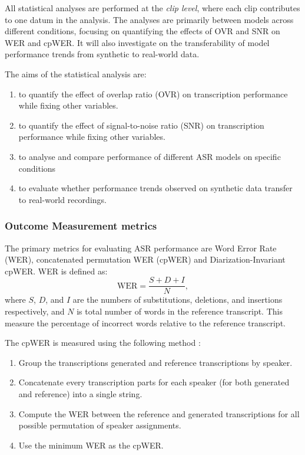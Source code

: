 
All statistical analyses are performed at the \textit{clip level}, where each clip contributes to one datum in the analysis. The analyses are primarily between models across different conditions, focusing on quantifying the effects of OVR and SNR on WER and cpWER. It will also investigate on the transferability of model performance trends from synthetic to real-world data.

The aims of the statistical analysis are:
\begin{enumerate}
    \item to quantify the effect of overlap ratio (OVR) on transcription performance while fixing other variables.
    \item to quantify the effect of signal-to-noise ratio (SNR) on transcription performance while fixing other variables.
    \item to analyse and compare performance of different ASR models on specific conditions
    \item to evaluate whether performance trends observed on synthetic data transfer to real-world recordings.
\end{enumerate}

\subsubsection{Outcome Measurement metrics}

The primary metrics for evaluating ASR performance are Word Error Rate (WER), concatenated permutation WER (cpWER) and Diarization-Invariant cpWER. WER is defined as: 
\begin{equation}
    \mathrm{WER} = \frac{S + D + I}{N},
\end{equation}
where \(S\), \(D\), and \(I\) are the numbers of substitutions, deletions, and insertions respectively, and \(N\) is total number of words in the reference transcript. This measure the percentage of incorrect words relative to the reference transcript. 

The cpWER is measured using the following method \cite{chime6}:
\begin{enumerate}
  \item Group the transcriptions generated and reference transcriptions by speaker.
  \item Concatenate every transcription parts for each speaker (for both generated and reference) into a single string.
  \item Compute the WER between the reference and generated transcriptions for all possible permutation of speaker assignments.
  \item Use the minimum WER as the cpWER.
\end{enumerate}

